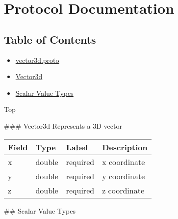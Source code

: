 \section{Protocol Documentation}\label{protocol-documentation}

\subsection{Table of Contents}\label{table-of-contents}

\begin{itemize}
\item
  \hyperref[vector3d.proto]{vector3d.proto}
\item
  \hyperref[experimot.msgs.Vector3d]{Vector3d}
\item
  \hyperref[scalar-value-types]{Scalar Value Types}
\end{itemize}

Top


 \#\#\# Vector3d Represents a 3D vector

\begin{longtable}[c]{@{}llll@{}}
\toprule
Field & Type & Label & Description\tabularnewline
\midrule
\endhead
x & double & required & x coordinate\tabularnewline
y & double & required & y coordinate\tabularnewline
z & double & required & z coordinate\tabularnewline
\bottomrule
\end{longtable}

 \#\# Scalar Value Types

